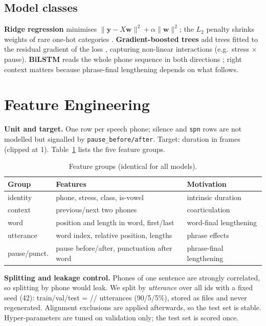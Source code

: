 \documentclass[conference]{IEEEtran}
\begin{document}
\subsection{Model classes}
\textbf{Ridge regression} minimises $\|\mathbf{y}-X\mathbf{w}\|^2+\alpha\|\mathbf{w}\|^2$; the $L_2$ penalty shrinks weights of rare one-hot categories \cite{hoerl1970}.
\textbf{Gradient-boosted trees} add trees fitted to the residual gradient of the loss \cite{friedman2001}, capturing non-linear interactions (e.g.\ stress $\times$ pause).
\textbf{BiLSTM} reads the whole phone sequence in both directions \cite{hochreiter1997}; right context matters because phrase-final lengthening depends on what follows.

\section{Feature Engineering}\label{sec:feat}
\textbf{Unit and target.} One row per speech phone; silence and \texttt{spn} rows are not modelled but signalled by \texttt{pause\_before/after}. Target: duration in frames (clipped at 1).
Table~\ref{tab:feat} lists the five feature groups.

\begin{table}[t]\centering\caption{Feature groups (identical for all models).}\label{tab:feat}
\footnotesize\begin{tabular}{@{}p{1.6cm}p{4.2cm}p{1.6cm}@{}}
\toprule
Group & Features & Motivation \\ \midrule
identity & phone, stress, class, is-vowel & intrinsic duration \\
context & previous/next two phones & coarticulation \\
word & position and length in word, first/last & word-final lengthening \\
utterance & word index, relative position, lengths & phrase effects \\
pause/punct. & pause before/after, punctuation after word & phrase-final lengthening \\ \bottomrule
\end{tabular}
\end{table}

\textbf{Splitting and leakage control.}
Phones of one sentence are strongly correlated, so splitting by phone would leak. We split by \emph{utterance} over all \nClips{} ids with a fixed seed (42): train/val/test = \nTrainIds{}/\nValIds{}/\nTestIds{} utterances (90/5/5\%), stored as files and never regenerated. Alignment exclusions are applied afterwards, so the test set is stable.
Hyper-parameters are tuned on validation only; the test set is scored once.
\end{document}
